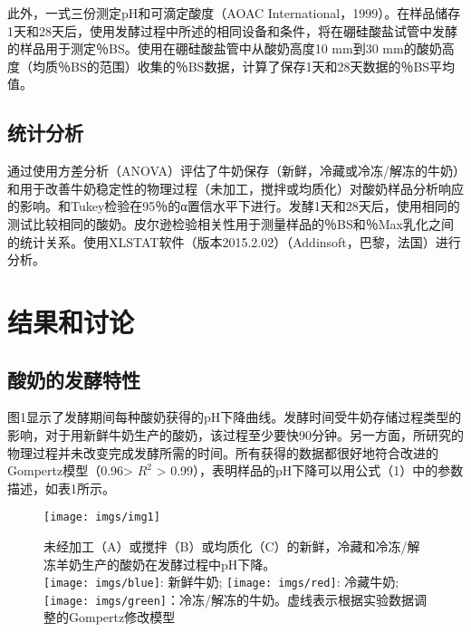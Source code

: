 \documentclass[twocolumn]{ctexart}
\begin{document}
此外，一式三份测定pH和可滴定酸度（AOAC International，1999）。在样品储存1天和28天后，使用发酵过程中所述的相同设备和条件，将在硼硅酸盐试管中发酵的样品用于测定％BS。使用在硼硅酸盐管中从酸奶高度10 mm到30 mm的酸奶高度（均质％BS的范围）收集的％BS数据，计算了保存1天和28天数据的％BS平均值。

\subsection{统计分析}
通过使用方差分析（ANOVA）评估了牛奶保存（新鲜，冷藏或冷冻/解冻的牛奶）和用于改善牛奶稳定性的物理过程（未加工，搅拌或均质化）对酸奶样品分析响应的影响。和Tukey检验在95％的α置信水平下进行。发酵1天和28天后，使用相同的测试比较相同的酸奶。皮尔逊检验相关性用于测量样品的％BS和％Max乳化之间的统计关系。使用XLSTAT软件（版本2015.2.02）（Addinsoft，巴黎，法国）进行分析。

\section{结果和讨论}
\subsection{酸奶的发酵特性}
图1显示了发酵期间每种酸奶获得的pH下降曲线。发酵时间受牛奶存储过程类型的影响，对于用新鲜牛奶生产的酸奶，该过程至少要快90分钟。另一方面，所研究的物理过程并未改变完成发酵所需的时间。所有获得的数据都很好地符合改进的Gompertz模型（0.96> $R^{2}$  > 0.99），表明样品的pH下降可以用公式（1）中的参数描述，如表1所示。

\begin{figure*}[!htb]
\centering
\texttt{[image: imgs/img1]}
		\caption{未经加工（A）或搅拌（B）或均质化（C）的新鲜，冷藏和冷冻/解冻羊奶生产的酸奶在发酵过程中pH下降。\\\texttt{[image: imgs/blue]}: 新鲜牛奶; \texttt{[image: imgs/red]}: 冷藏牛奶; \texttt{[image: imgs/green]}：冷冻/解冻的牛奶。虚线表示根据实验数据调整的Gompertz修改模型}
\end{figure*}
\end{document}
